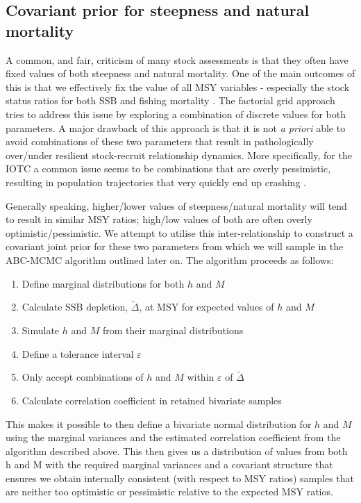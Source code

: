 \documentclass[11pt]{article}
\newcommand{\veps}{\varepsilon}
\begin{document}
\subsection{Covariant prior for steepness and natural mortality}

A common, and fair, criticism of many stock assessments is that they often have fixed values of both steepness and natural mortality. One of the main outcomes of this is that we effectively fix the value of all MSY variables - especially the stock status ratios for both SSB and fishing mortality \cite{steepm}. The factorial grid approach tries to address this issue by exploring a combination of discrete values for both parameters. A major drawback of this approach is that it is not \textit{a priori} able to avoid combinations of these two parameters that result in pathologically over/under resilient stock-recruit relationship dynamics. More specifically, for the IOTC a common issue seems to be combinations that are overly pessimistic, resulting in population trajectories that very quickly end up crashing \cite{alb}.

Generally speaking, higher/lower values of steepness/natural mortality will tend to result in similar MSY ratios; high/low values of both are often overly optimistic/pessimistic. We attempt to utilise this inter-relationship to construct a covariant joint prior for these two parameters from which we will sample in the ABC-MCMC algorithm outlined later on. The algorithm proceeds as follows:

\begin{enumerate}
    \item Define marginal distributions for both $h$ and $M$
    \item Calculate SSB depletion, $\tilde{\Delta}$, at MSY for expected values of $h$ and $M$
    \item Simulate $h$ and $M$ from their marginal distributions
    \item Define a tolerance interval $\veps$
    \item Only accept combinations of $h$ and $M$ within $\veps$ of $\tilde{\Delta}$
    \item Calculate correlation coefficient in retained bivariate samples
\end{enumerate}

This makes it possible to then define a bivariate normal distribution for $h$ and $M$ using the marginal variances and the estimated correlation coefficient from the algorithm described above. This then gives us a distribution of values from both h and M with the required marginal variances and a covariant structure that ensures we obtain internally consistent (with respect to MSY ratios) samples that are neither too optimistic or pessimistic relative to the expected MSY ratios.
\end{document}
